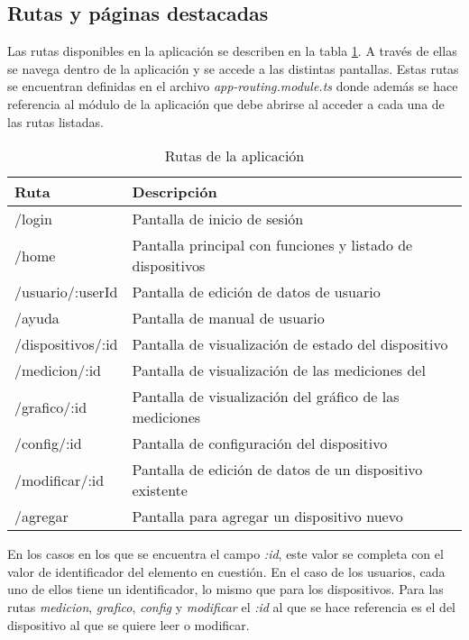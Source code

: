 \subsection{Rutas y páginas destacadas}

Las rutas disponibles en la aplicación se describen en la tabla \ref{tab:rutas}. A través de ellas se navega dentro de la aplicación y se accede a las distintas pantallas. Estas rutas se encuentran definidas en el archivo \textit{app-routing.module.ts} donde además se hace referencia al módulo de la aplicación que debe abrirse al acceder a cada una de las rutas listadas.

\begin{table}[h]
\centering
\caption[Rutas]{Rutas de la aplicación}
\begin{tabular}{l l}
\toprule
\textbf{Ruta} 			& \textbf{Descripción}\\
\midrule
/login					& Pantalla de inicio de sesión\\
/home					& Pantalla principal con funciones y listado de dispositivos\\
/usuario/:userId			& Pantalla de edición de datos de usuario\\
/ayuda					& Pantalla de manual de usuario\\
/dispositivos/:id		& Pantalla de visualización de estado del dispositivo\\
/medicion/:id			& Pantalla de visualización de las mediciones del\\
/grafico/:id				& Pantalla de visualización del gráfico de las mediciones\\
/config/:id				& Pantalla de configuración del dispositivo\\
/modificar/:id			& Pantalla de edición de datos de un dispositivo existente\\
/agregar					& Pantalla para agregar un dispositivo nuevo\\
\bottomrule
\hline
\end{tabular}
\label{tab:rutas}
\end{table}

En los casos en los que se encuentra el campo \textit{:id}, este valor se completa con el valor de identificador del elemento en cuestión. En el caso de los usuarios, cada uno de ellos tiene un identificador, lo mismo que para los dispositivos. Para las rutas \textit{medicion}, \textit{grafico}, \textit{config} y \textit{modificar} el \textit{:id} al que se hace referencia es el del dispositivo al que se quiere leer o modificar.

